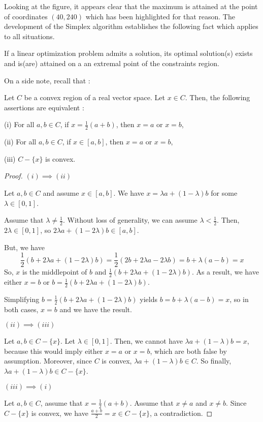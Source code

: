 Looking at the figure, it appears clear that the maximum is attained at the point of coordinates $ (40,240) $ which has been highlighted for that reason. The development of the Simplex algorithm establishes the following fact which applies to all situations.

\begin{theorem}
    If a linear optimization problem admits a solution, its optimal solution(s) exists and is(are) attained on a an extremal point of the constraints region.
\end{theorem}

On a side note, recall that :

\begin{proposition}\label{prop:extremal-points}
    Let $ C $ be a convex region of a real vector space. Let $ x \in C $. Then, the following assertions are equivalent :

    (i) For all $ a,b \in C $, if $ x = \frac 1 2 (a+b) $, then $ x = a $ or $ x = b $,

    (ii) For all $ a,b \in C $, if $ x \in [a,b] $, then $ x = a $ or $ x = b $,

    (iii) $ C - \{ x \} $ is convex.
\end{proposition}

\begin{proof}
    $ (i) \implies (ii) $
    
    Let $ a,b \in C $ and assume $ x \in [a,b] $. We have $ x = \lambda a + (1-\lambda) b $ for some $ \lambda \in [0,1] $.

    Assume that $ \lambda \neq \frac 1 2 $. Without loss of generality, we can assume $ \lambda < \frac 1 2 $. Then, $ 2\lambda \in [0,1] $, so $ 2\lambda a + (1-2\lambda) b \in [a,b] $.

    But, we have
    \[
        \frac 1 2 (b + 2\lambda a + (1-2\lambda)b) = \frac 1 2 (2b + 2\lambda a - 2\lambda b) = b + \lambda (a - b) = x
    \]
    So, $ x $ is the middlepoint of $ b $ and $ \frac 1 2 (b + 2\lambda a + (1-2\lambda)b) $. As a result, we have either $ x = b $ or $ b = \frac 1 2 (b + 2\lambda a + (1-2\lambda)b )$.

    Simplifying $ b = \frac 1 2 (b + 2\lambda a + (1-2\lambda)b ) $ yields $ b = b + \lambda (a - b) = x $, so in both cases, $ x = b $ and we have the result.

    $ (ii) \implies (iii) $
    
    Let $ a,b \in C - \{ x \} $. Let $ \lambda \in [0,1] $. Then, we cannot have $ \lambda a + (1-\lambda) b = x $, because this would imply either $ x = a $ or $ x = b $, which are both false by assumption. Moreover, since $ C $ is convex, $ \lambda a + (1-\lambda) b \in C $. So finally, $ \lambda a + (1-\lambda) b \in C - \{ x \}$. 
    
    $ (iii) \implies (i) $

    Let $ a,b \in C $, assume that $ x = \frac 1 2 (a+b) $. Assume that $ x \neq a $ and $ x \neq b $. Since $ C - \{ x \} $ is convex, we have $ \frac{a+b}{2} = x \in C - \{ x \}$, a contradiction.
\end{proof}

